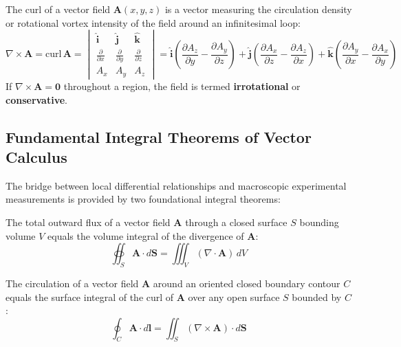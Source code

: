 \begin{definition}
The curl of a vector field $\mathbf{A}(x,y,z)$ is a vector measuring the circulation density or rotational vortex intensity of the field around an infinitesimal loop:
\begin{equation}
    \nabla \times \mathbf{A} = \text{curl}\,\mathbf{A} = 
    \begin{vmatrix}
    \hat{\mathbf{i}} & \hat{\mathbf{j}} & \hat{\mathbf{k}} \\
    \frac{\partial}{\partial x} & \frac{\partial}{\partial y} & \frac{\partial}{\partial z} \\
    A_x & A_y & A_z
    \end{vmatrix}
    = \hat{\mathbf{i}}\left(\frac{\partial A_z}{\partial y} - \frac{\partial A_y}{\partial z}\right)
    + \hat{\mathbf{j}}\left(\frac{\partial A_x}{\partial z} - \frac{\partial A_z}{\partial x}\right)
    + \hat{\mathbf{k}}\left(\frac{\partial A_y}{\partial x} - \frac{\partial A_x}{\partial y}\right)
\end{equation}
If $\nabla \times \mathbf{A} = \mathbf{0}$ throughout a region, the field is termed \textbf{irrotational} or \textbf{conservative}.
\end{definition}

\subsection{Fundamental Integral Theorems of Vector Calculus}
The bridge between local differential relationships and macroscopic experimental measurements is provided by two foundational integral theorems:

\begin{keyequation}
The total outward flux of a vector field $\mathbf{A}$ through a closed surface $S$ bounding volume $V$ equals the volume integral of the divergence of $\mathbf{A}$:
\begin{equation}
    \oiint_S \mathbf{A} \cdot d\mathbf{S} = \iiint_V (\nabla \cdot \mathbf{A})\, dV
\end{equation}
\end{keyequation}

\begin{keyequation}
The circulation of a vector field $\mathbf{A}$ around an oriented closed boundary contour $C$ equals the surface integral of the curl of $\mathbf{A}$ over any open surface $S$ bounded by $C$:
\begin{equation}
    \oint_C \mathbf{A} \cdot d\mathbf{l} = \iint_S (\nabla \times \mathbf{A}) \cdot d\mathbf{S}
\end{equation}
\end{keyequation}

